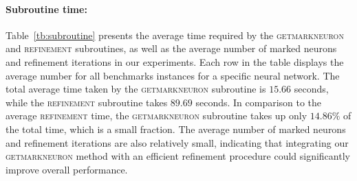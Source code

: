 \paragraph{Subroutine time: }
{\color{red}
Table~\ref{tb:subroutine} presents the average time required by the \textsc{getmarkneuron} and \textsc{refinement} 
subroutines, as well as the average number of marked neurons and refinement iterations in our experiments. 
Each row in the table displays the average number for all benchmarks instances for a specific neural network. 
The total average time taken by the \textsc{getmarkneuron} subroutine is $15.66$ seconds, while the \textsc{refinement}
subroutine takes $89.69$ seconds. In comparison to the average \textsc{refinement} time, the \textsc{getmarkneuron} 
subroutine takes up only $14.86\%$ of the total time, which is a small fraction. 
The average number of marked neurons and refinement iterations are also relatively small, 
indicating that integrating our \textsc{getmarkneuron} method with an efficient refinement procedure could significantly 
improve overall performance. 
}

\begin{table}[t]
  \centering
      \caption{Avrage marking, refinement time and average number of marked neurons and refinement iterations}
      \label{tb:subroutine}
  \end{table}

